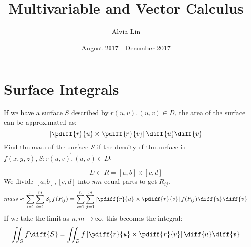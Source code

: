 \documentclass{math}
\title{Multivariable and Vector Calculus}
\author{Alvin Lin}
\date{August 2017 - December 2017}
\begin{document}
\maketitle

\section*{Surface Integrals}
If we have a surface \( S \) described by \( r(u,v), (u,v)\in D \), the
area of the surface can be approximated as:
\[ \left|\pdiff{r}{u}\times\pdiff{r}{v}\right|\diff{u}\diff{v} \]
Find the mass of the surface \( S \) if the density of the surface is
\( f(x,y,z), S:\overrightarrow{r(u,v)}, (u,v)\in D \).
\begin{center}
\end{center}
\[ D\subset R = [a,b]\times[c,d] \]
We divide \( [a,b],[c,d] \) into \( nm \) equal parts to get \( R_{ij} \).
\[ mass \approx \sum_{i=1}^{n}\sum_{i=1}^{m}S_yf(P_{ij}) =
  \sum_{i=1}^{n}\sum_{j=1}^{m}\left|\pdiff{r}{u}\times\pdiff{r}{v}\right|
    f(P_{ij}) \diff{u}\diff{v} \]
If we take the limit as \( n,m\to\infty \), this becomes the integral:
\[ \iint_{S}f\diff{S} =
  \iint_{D}f\left|\pdiff{r}{u}\times\pdiff{r}{v}\right|\diff{u}\diff{v} \]
\end{document}

